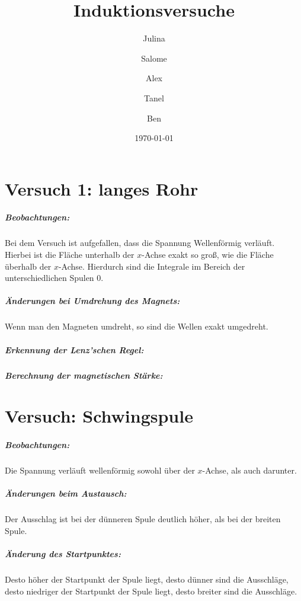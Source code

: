 \documentclass[a4paper, 12pt]{report}
\begin{document}
	\title{Induktionsversuche}
	\date{\today}
	\author{Julina \and Salome \and Alex \and Tanel \and Ben}
	\maketitle
	\bsremovechaptertitle
	\noindent
	\tableofcontents
	\chapter{Versuch 1: langes Rohr}
	\paragraph{Beobachtungen:}
	Bei dem Versuch ist aufgefallen, dass die Spannung Wellenförmig verläuft.
	Hierbei ist die Fläche unterhalb der $x$-Achse exakt so groß, wie die Fläche überhalb der $x$-Achse.
	Hierdurch sind die Integrale im Bereich der unterschiedlichen Spulen $0$.
	\paragraph{Änderungen bei Umdrehung des Magnets:}
	Wenn man den Magneten umdreht, so sind die Wellen exakt umgedreht.
	\paragraph{Erkennung der Lenz'schen Regel:}
	\paragraph{Berechnung der magnetischen Stärke:}
	\chapter{Versuch: Schwingspule}
	\paragraph{Beobachtungen:} Die Spannung verläuft wellenförmig sowohl über der $x$-Achse, als auch darunter.
	\paragraph{Änderungen beim Austausch:}
	Der Ausschlag ist bei der dünneren Spule deutlich höher, als bei der breiten Spule.
	\paragraph{Änderung des Startpunktes:}
	Desto höher der Startpunkt der Spule liegt, desto dünner sind die Ausschläge, desto niedriger der Startpunkt der Spule liegt, desto breiter sind die Ausschläge.
\end{document}
